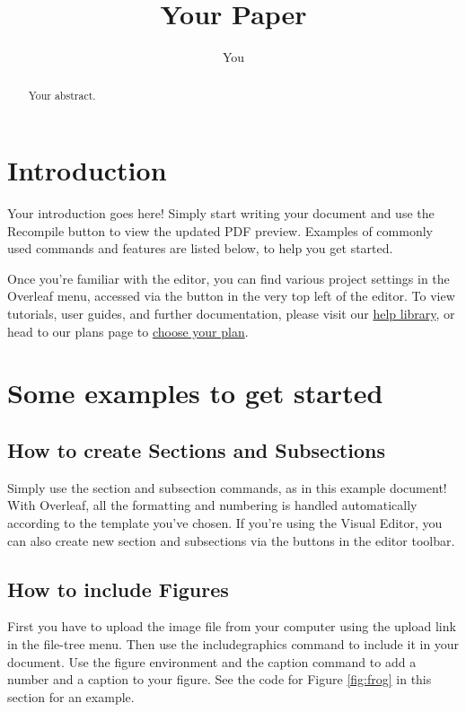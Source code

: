 \documentclass{article}
\title{Your Paper}
\author{You}
\begin{document}
\maketitle

\begin{abstract}
    Your abstract.
\end{abstract}

\section{Introduction}

Your introduction goes here! Simply start writing your document and use the Recompile button to view the updated PDF preview. Examples of commonly used commands and features are listed below, to help you get started.

Once you're familiar with the editor, you can find various project settings in the Overleaf menu, accessed via the button in the very top left of the editor. To view tutorials, user guides, and further documentation, please visit our \href{https://www.overleaf.com/learn}{help library}, or head to our plans page to \href{https://www.overleaf.com/user/subscription/plans}{choose your plan}.

\section{Some examples to get started}

\subsection{How to create Sections and Subsections}

Simply use the section and subsection commands, as in this example document! With Overleaf, all the formatting and numbering is handled automatically according to the template you've chosen. If you're using the Visual Editor, you can also create new section and subsections via the buttons in the editor toolbar.

\subsection{How to include Figures}

First you have to upload the image file from your computer using the upload link in the file-tree menu. Then use the includegraphics command to include it in your document. Use the figure environment and the caption command to add a number and a caption to your figure. See the code for Figure \ref{fig:frog} in this section for an example.
\end{document}
